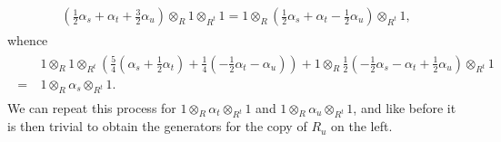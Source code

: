\begin{example}
\begin{align*}
\begin{split}
\left(\frac{1}{2}\alpha_s + \alpha_t + \frac{3}{2}\alpha_u\right) \otimes_R 1 \otimes_{R^t} 1 = 1 \otimes_R \left(\frac{1}{2}\alpha_s + \alpha_t - \frac{1}{2}\alpha_u\right) \otimes_{R^t} 1,
\end{split}
\end{align*}
\noindent whence
\begin{align*}
\begin{split}
&\ 1 \otimes_R 1 \otimes_{R^t} \left(\frac{5}{4}\left(\alpha_s + \frac{1}{2}\alpha_t\right) + \frac{1}{4}\left(-\frac{1}{2}\alpha_t - \alpha_u\right)\right) + 1 \otimes_R \frac{1}{2}\left(-\frac{1}{2}\alpha_s - \alpha_t + \frac{1}{2}\alpha_u\right) \otimes_{R^t} 1\\
=&\ 1 \otimes_R \alpha_s \otimes_{R^t} 1.
\end{split}
\end{align*}
\noindent We can repeat this process for $1 \otimes_R \alpha_t \otimes_{R^t} 1$ and $1 \otimes_R \alpha_u \otimes_{R^t} 1$, and like before it is then trivial to obtain the generators for the copy of $R_u$ on the left.\newpage


\end{example}
